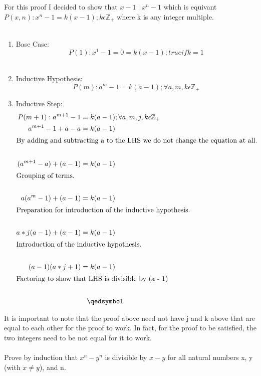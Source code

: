 \documentclass[12pt]{article}
\begin{document}
\noindent For this proof I decided to show that \begin{math}x - 1\mid x^n - 1\end{math} which is equivant \begin{math}P(x,n):x^n - 1 = k(x - 1) ; k \epsilon \mathbb{Z}_+ \end{math} where k is any integer multiple.\\\\ 
\begin{enumerate}
\item Base Case:\\
\[P(1):x^1 - 1 = 0 = k(x - 1); true if k = 1\]\\
\item Inductive Hypothesis:
\[P(m):a^m - 1 = k(a - 1) ; \forall a,m,k \epsilon \mathbb{Z}_+\]
\item Inductive Step:\\
\begin{align*}
P(m+1):a^{m+1} - 1 &= k(a - 1) ; \forall a,m,j,k \epsilon \mathbb{Z}_+\\
a^{m+1} - 1 + a - a &= k(a - 1)\\
\intertext{By adding and subtracting a to the LHS we do not change the equation at all.}\\
(a^{m+1} - a) + (a - 1) &= k(a - 1)\\
\intertext{Grouping of terms.}\\
a(a^{m} - 1) + (a - 1) &= k(a - 1)\\
\intertext{Preparation for introduction of the inductive hypothesis.}\\
a*j(a - 1) + (a - 1) &= k(a - 1)\\
\intertext{Introduction of the inductive hypothesis.}\\
(a - 1)(a*j + 1) &= k(a - 1)\\
\intertext{Factoring to show that LHS is divisible by (a - 1)}\\
&\hspace{0.3cm}\qedsymbol
\end{align*}
\end{enumerate}
It is important to note that the proof above need not have j and k above that are equal to each other for the proof to work. In fact, for the proof to be satisfied, the two integers need to be not equal for it to work.\\\\
Prove by induction that \begin{math}x^n - y^n\end{math} is divisible by \begin{math}x - y\end{math} for all natural numbers x, y (with \begin{math}x \not = y\end{math}), and n.\\\\
\end{document}
